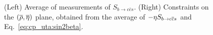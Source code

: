 \begin{figure}[htb]
  \begin{center}
    \hfill
  \end{center}
  \vspace{-0.5cm}
  \caption{
    (Left) Average of measurements of $S_{b \to c\bar c s}$.
    (Right) Constraints on the $(\overline{\rho},\overline{\eta})$ plane,
    obtained from the average of $-\etacp S_{b \to c\bar c s}$ 
    and Eq.~\ref{eq:cp_uta:sin2beta}.
  }
  \label{fig:cp_uta:ccs}
\end{figure}

